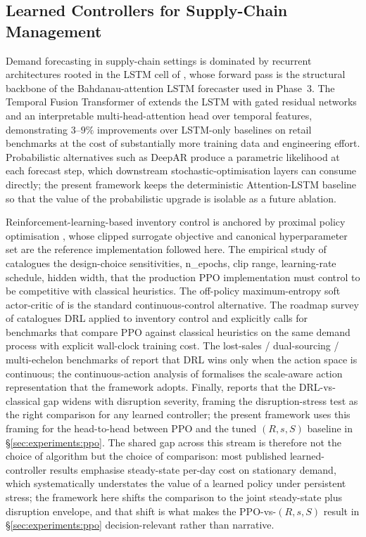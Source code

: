 \documentclass[review,preprint,authoryear,12pt]{elsarticle}
\begin{document}
\subsection{Learned Controllers for Supply-Chain Management}
\label{sec:lit:learned}

Demand forecasting in supply-chain settings is dominated by recurrent
architectures rooted in the LSTM cell of \citet{hochreiter1997lstm},
whose forward pass is the structural backbone of the
Bahdanau-attention LSTM forecaster used in Phase~3. The Temporal
Fusion Transformer of \citet{lim2021tft} extends the LSTM with gated
residual networks and an interpretable multi-head-attention head over
temporal features, demonstrating $3$--$9\%$ improvements over
LSTM-only baselines on retail benchmarks at the cost of substantially
more training data and engineering effort. Probabilistic alternatives
such as DeepAR \citep{salinas2020deepar} produce a parametric
likelihood at each forecast step, which downstream
stochastic-optimisation layers can consume directly; the present
framework keeps the deterministic Attention-LSTM baseline so that the
value of the probabilistic upgrade is isolable as a future ablation.

Reinforcement-learning-based inventory control is anchored by
proximal policy optimisation \citep{schulman2017ppo}, whose clipped
surrogate objective and canonical hyperparameter set are the
reference implementation followed here. The empirical study of
\citet{andrychowicz2021what} catalogues the design-choice
sensitivities, n\_epochs, clip range, learning-rate schedule, hidden
width, that the production PPO implementation must control to be
competitive with classical heuristics. The off-policy maximum-entropy
soft actor-critic of \citet{haarnoja2018sac} is the standard
continuous-control alternative. The roadmap survey of
\citet{boute2022drl_inventory} catalogues DRL applied to inventory
control and explicitly calls for benchmarks that compare PPO against
classical heuristics on the same demand process with explicit
wall-clock training cost. The lost-sales / dual-sourcing /
multi-echelon benchmarks of \citet{gijsbrechts2022drl_inventory}
report that DRL wins only when the action space is continuous; the
continuous-action analysis of \citet{vanvuchelen2024continuous_action}
formalises the scale-aware action representation that the framework
adopts. Finally, \citet{yang2024drl_disruption} reports that the
DRL-vs-classical gap widens with disruption severity, framing the
disruption-stress test as the right comparison for any learned
controller; the present framework uses this framing for the
head-to-head between PPO and the tuned $(R, s, S)$ baseline in
\S\ref{sec:experiments:ppo}. The shared gap across this stream is
therefore not the choice of algorithm but the choice of comparison:
most published learned-controller results emphasise steady-state
per-day cost on stationary demand, which systematically understates
the value of a learned policy under persistent stress; the framework
here shifts the comparison to the joint steady-state plus disruption
envelope, and that shift is what makes the
PPO-vs-$(R, s, S)$ result in \S\ref{sec:experiments:ppo}
decision-relevant rather than narrative.
\end{document}
